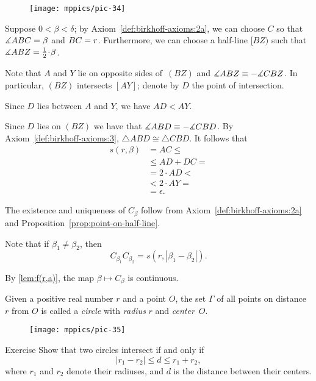 {

\begin{wrapfigure}{o}{36mm}
\centering
\texttt{[image: mppics/pic-34]}
\end{wrapfigure}

Suppose $0<\beta<\delta$;
by Axiom~\ref{def:birkhoff-axioms:2a}, we can choose $C$ so that $\measuredangle ABC=\beta$ and $BC=r$.
Furthermore, we can choose a half-line $[BZ)$ such that $\measuredangle ABZ\z=\tfrac12\cdot \beta$.

Note that $A$ and $Y$ lie on opposite sides of~$(BZ)$ and  $\measuredangle ABZ\equiv -\measuredangle CBZ$.
In particular, $(BZ)$ intersects $[AY]$;
denote by $D$ the point of intersection.

Since $D$ lies between $A$ and $Y$, we have $AD<AY$.

Since $D$ lies on $(BZ)$ we have that $\measuredangle ABD\equiv -\measuredangle CBD$.
By Axiom~\ref{def:birkhoff-axioms:3},
$\triangle ABD\cong \triangle CBD$.
It follows that
\begin{align*}
s(r,\beta)&=AC\le
\\
&\le AD+DC=
\\
&=2\cdot AD< 
\\
&< 2\cdot AY=
\\
&=\epsilon.
\end{align*}
\qedsf

}

The existence and uniqueness of $C_\beta$ follow from Axiom~\ref{def:birkhoff-axioms:2a} and Proposition~\ref{prop:point-on-half-line}.

Note that if $\beta_1\ne\beta_2$, then
$$C_{\beta_1}C_{\beta_2}=s(r,|\beta_1-\beta_2|).$$

By \ref{lem:f(r,a)}, the map $\beta\mapsto C_\beta$ is continuous.
\qeds



Given a positive real number $r$ and a point $O$,
the set $\Gamma$ of all points on distance $r$ from $O$ is called a \emph{circle} 
with \emph{radius} $r$ and \emph{center}~$O$.

\begin{wrapfigure}{r}{40mm}
\centering
\texttt{[image: mppics/pic-35]}
\end{wrapfigure}

\begin{thm}{Exercise}\label{ex:intersecting-circles-3}
Show that two circles intersect if and only if 
\[|r_1-r_2|\le d\le r_1+r_2,\]
where $r_1$ and $r_2$ denote their radiuses, and $d$ is the distance between their centers.
\end{thm}
